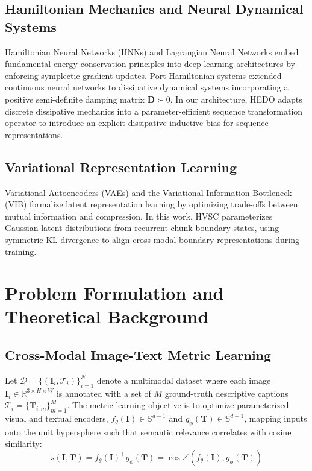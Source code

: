 \documentclass[pdflatex,sn-mathphys-num]{sn-jnl}%
\begin{document}
\subsection{Hamiltonian Mechanics and Neural Dynamical Systems}
Hamiltonian Neural Networks (HNNs) \cite{greydanus2019hamiltonian} and Lagrangian Neural Networks \cite{cranmer2020lagrangian} embed fundamental energy-conservation principles into deep learning architectures by enforcing symplectic gradient updates. Port-Hamiltonian systems \cite{massaroli2019port} extended continuous neural networks to dissipative dynamical systems incorporating a positive semi-definite damping matrix $\mathbf{D} \succ 0$. In our architecture, HEDO adapts discrete dissipative mechanics into a parameter-efficient sequence transformation operator to introduce an explicit dissipative inductive bias for sequence representations.

\subsection{Variational Representation Learning}
Variational Autoencoders (VAEs) \cite{kingma2013auto} and the Variational Information Bottleneck (VIB) \cite{alemi2016deep} formalize latent representation learning by optimizing trade-offs between mutual information and compression. In this work, HVSC parameterizes Gaussian latent distributions from recurrent chunk boundary states, using symmetric KL divergence to align cross-modal boundary representations during training.

\section{Problem Formulation and Theoretical Background}
\label{sec:problem_formulation}

\subsection{Cross-Modal Image-Text Metric Learning}
Let $\mathcal{D} = \{(\mathbf{I}_i, \mathcal{T}_i)\}_{i=1}^N$ denote a multimodal dataset where each image $\mathbf{I}_i \in \mathbb{R}^{3 \times H \times W}$ is annotated with a set of $M$ ground-truth descriptive captions $\mathcal{T}_i = \{\mathbf{T}_{i,m}\}_{m=1}^M$. The metric learning objective is to optimize parameterized visual and textual encoders, $f_{\theta}(\mathbf{I}) \in \mathbb{S}^{d-1}$ and $g_{\phi}(\mathbf{T}) \in \mathbb{S}^{d-1}$, mapping inputs onto the unit hypersphere such that semantic relevance correlates with cosine similarity:
\begin{equation}
s(\mathbf{I}, \mathbf{T}) = f_{\theta}(\mathbf{I})^\top g_{\phi}(\mathbf{T}) = \cos\angle\left(f_{\theta}(\mathbf{I}), g_{\phi}(\mathbf{T})\right)
\end{equation}
\end{document}
